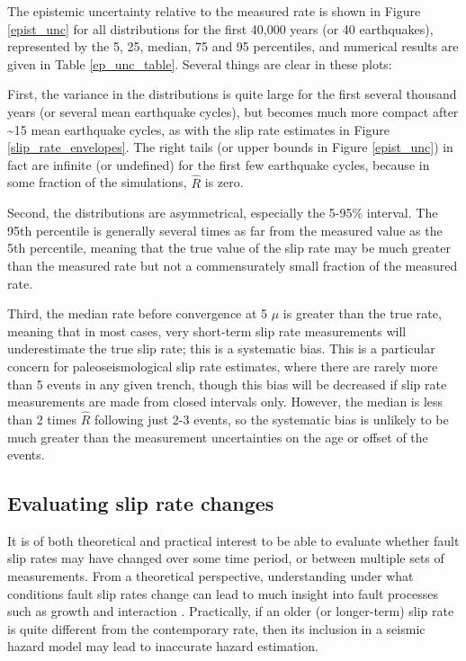 \documentclass[se, manuscript]{copernicus}
\begin{document}
The epistemic uncertainty relative to the measured rate is shown in
Figure \ref{epist_unc} for all distributions for the first 40,000 years
(or 40 earthquakes), represented by the 5, 25, median, 75 and 95
percentiles, and numerical results are given in Table
\ref{ep_unc_table}. Several things are clear in these plots:

First, the variance in the distributions is quite large for the first
several thousand years (or several mean earthquake cycles), but becomes
much more compact after \textasciitilde{}15 mean earthquake cycles, as
with the slip rate estimates in Figure \ref{slip_rate_envelopes}. The
right tails (or upper bounds in Figure \ref{epist_unc}) in fact are
infinite (or undefined) for the first few earthquake cycles, because in
some fraction of the simulations, \(\hat{R}\) is zero.

Second, the distributions are asymmetrical, especially the 5-95\%
interval. The 95th percentile is generally several times as far from the
measured value as the 5th percentile, meaning that the true value of the
slip rate may be much greater than the measured rate but not a
commensurately small fraction of the measured rate.

Third, the median rate before convergence at 5 \(\mu\) is greater than
the true rate, meaning that in most cases, very short-term slip rate
measurements will underestimate the true slip rate; this is a systematic
bias. This is a particular concern for paleoseismological slip rate
estimates, where there are rarely more than 5 events in any given
trench, though this bias will be decreased if slip rate measurements are made
from closed intervals only. However, the median is less than 2 times
\(\hat{R}\) following just 2-3 events, so the systematic bias is unlikely to
be much greater than the measurement uncertainties on the age or offset of
the events.

\subsection{Evaluating slip rate
changes}\label{evaluating-slip-rate-changes}

It is of both theoretical and practical interest to be able to evaluate
whether fault slip rates may have changed over some time period, or
between multiple sets of measurements. From a theoretical perspective,
understanding under what conditions fault slip rates change can lead to
much insight into fault processes such as growth
\citep[e.g.,][]{roberts_fault_2002} and interaction
\citep[e.g.,][]{wallace_grouping_1987,dolan_long-range_2007}. Practically,
if an older (or longer-term) slip rate is quite different from the
contemporary rate, then its inclusion in a seismic hazard model may lead
to inaccurate hazard estimation.
\end{document}

